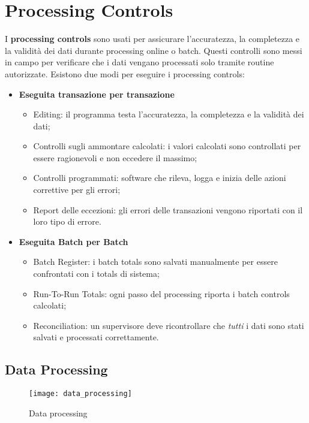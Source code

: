\section{Processing Controls}

I \textbf{processing controls} sono usati per assicurare
l'accuratezza, la completezza e la validità dei dati durante
processing online o batch. Questi controlli sono messi in campo
per verificare che i dati vengano processati solo tramite routine
autorizzate. Esistono due modi per eseguire i processing controls:

\begin{itemize}
\item \textbf{Eseguita transazione per transazione}
\begin{itemize}
\item Editing: il programma testa l'accuratezza, la completezza
e la validità dei dati;
\item Controlli sugli ammontare calcolati: i valori calcolati
sono controllati per essere ragionevoli e non eccedere il massimo;
\item Controlli programmati: software che rileva, logga e inizia
delle azioni correttive per gli errori;
\item Report delle eccezioni: gli errori delle transazioni vengono
riportati con il loro tipo di errore.
\end{itemize}

\item \textbf{Eseguita Batch per Batch}

\begin{itemize}
\item Batch Register: i batch totals sono salvati manualmente per essere
confrontati con i totals di sistema;
\item Run-To-Run Totals: ogni passo del processing riporta i batch
controls calcolati;
\item Reconciliation: un supervisore deve ricontrollare che \emph{tutti}
i dati sono stati salvati e processati correttamente.
\end{itemize}
\end{itemize}

\subsection{Data Processing}

\begin{figure}[h!]
        \begin{center}
                \texttt{[image: data\_processing]}
        \end{center}
        \caption{Data processing}
        \label{fig:data:processing}
\end{figure}

